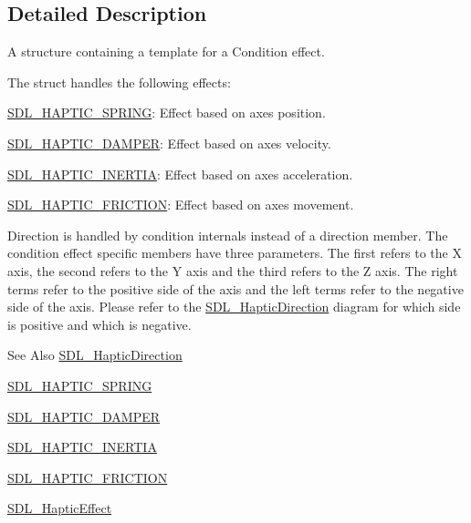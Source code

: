 \subsection{Detailed Description}
A structure containing a template for a Condition effect. 

The struct handles the following effects\-:
\begin{DoxyItemize}
\item \hyperlink{_s_d_l__haptic_8h_a3b52d4700380085e2b5d87bb20320fb1}{S\-D\-L\-\_\-\-H\-A\-P\-T\-I\-C\-\_\-\-S\-P\-R\-I\-N\-G}\-: Effect based on axes position.
\item \hyperlink{_s_d_l__haptic_8h_a69522f261973e3ea4273486141320a87}{S\-D\-L\-\_\-\-H\-A\-P\-T\-I\-C\-\_\-\-D\-A\-M\-P\-E\-R}\-: Effect based on axes velocity.
\item \hyperlink{_s_d_l__haptic_8h_a14b807471589120395aec28293cf6642}{S\-D\-L\-\_\-\-H\-A\-P\-T\-I\-C\-\_\-\-I\-N\-E\-R\-T\-I\-A}\-: Effect based on axes acceleration.
\item \hyperlink{_s_d_l__haptic_8h_a98a5011311168d63921aaac21403a4d8}{S\-D\-L\-\_\-\-H\-A\-P\-T\-I\-C\-\_\-\-F\-R\-I\-C\-T\-I\-O\-N}\-: Effect based on axes movement.
\end{DoxyItemize}

Direction is handled by condition internals instead of a direction member. The condition effect specific members have three parameters. The first refers to the X axis, the second refers to the Y axis and the third refers to the Z axis. The right terms refer to the positive side of the axis and the left terms refer to the negative side of the axis. Please refer to the \hyperlink{struct_s_d_l___haptic_direction}{S\-D\-L\-\_\-\-Haptic\-Direction} diagram for which side is positive and which is negative.

\begin{DoxySeeAlso}{See Also}
\hyperlink{struct_s_d_l___haptic_direction}{S\-D\-L\-\_\-\-Haptic\-Direction} 

\hyperlink{_s_d_l__haptic_8h_a3b52d4700380085e2b5d87bb20320fb1}{S\-D\-L\-\_\-\-H\-A\-P\-T\-I\-C\-\_\-\-S\-P\-R\-I\-N\-G} 

\hyperlink{_s_d_l__haptic_8h_a69522f261973e3ea4273486141320a87}{S\-D\-L\-\_\-\-H\-A\-P\-T\-I\-C\-\_\-\-D\-A\-M\-P\-E\-R} 

\hyperlink{_s_d_l__haptic_8h_a14b807471589120395aec28293cf6642}{S\-D\-L\-\_\-\-H\-A\-P\-T\-I\-C\-\_\-\-I\-N\-E\-R\-T\-I\-A} 

\hyperlink{_s_d_l__haptic_8h_a98a5011311168d63921aaac21403a4d8}{S\-D\-L\-\_\-\-H\-A\-P\-T\-I\-C\-\_\-\-F\-R\-I\-C\-T\-I\-O\-N} 

\hyperlink{union_s_d_l___haptic_effect}{S\-D\-L\-\_\-\-Haptic\-Effect} 
\end{DoxySeeAlso}


